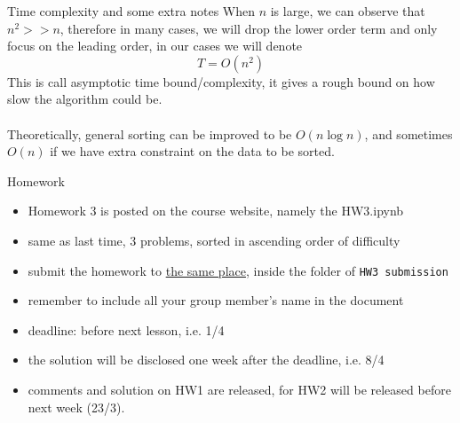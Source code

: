 \documentclass[10pt,xcolor={table,dvipsnames},t]{beamer}
\begin{document}
\begin{frame}{Time complexity and some extra notes}
When $n$ is large, we can observe that $n^{2}>>n$, therefore in many cases, we will drop the lower order term and only focus on the leading order, in our cases we will denote
$$T=O(n^{2})$$
This is call asymptotic time bound/complexity, it gives a rough bound on how slow the algorithm could be.\\\enspace\\
Theoretically, general sorting can be improved to be $O(n\log n)$, and sometimes $O(n)$ if we have extra constraint on the data to be sorted.
\end{frame}

\begin{frame}[fragile]{Homework}
  \begin{itemize}
    \item Homework 3 is posted on the course website, namely the HW3.ipynb
    \item same as last time, 3 problems, sorted in ascending order of difficulty
    \item submit the homework to \href{https://drive.google.com/drive/folders/1TqSFSwu8-KdzIHZcQWB7PjgqPJen4dsO?usp=sharing}{the same place}, inside the folder of \texttt{HW3 submission}
    \item remember to include all your group member's name in the document
    \item deadline: before next lesson, i.e. 1/4
    \item the solution will be disclosed one week after the deadline, i.e. 8/4
    \item comments and solution on HW1 are released, for HW2 will be released before next week (23/3).
  \end{itemize}
\end{frame}
\end{document}
